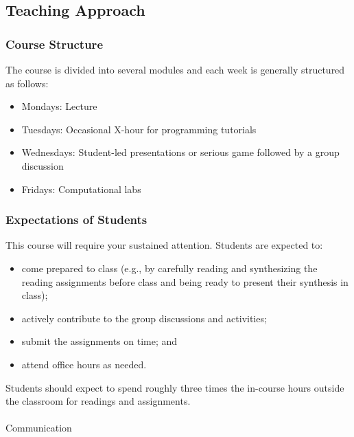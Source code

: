 \documentclass[
  11pt,
]{article}
\makeatletter
\let\oldparagraph\paragraph
\renewcommand{\paragraph}{
    \@ifstar
      \xxxParagraphStar
      \xxxParagraphNoStar
  }
\newcommand{\xxxParagraphStar}[1]{\oldparagraph*{#1}\mbox{}}
\newcommand{\xxxParagraphNoStar}[1]{\oldparagraph{#1}\mbox{}}
\providecommand{\tightlist}{%
  \setlength{\itemsep}{0pt}\setlength{\parskip}{0pt}}\usepackage{longtable,booktabs,array}
\makeatother
\begin{document}
\subsection{Teaching Approach}\label{teaching-approach}

\subsubsection{Course Structure}\label{course-structure}

The course is divided into several modules and each week is generally
structured as follows:

\begin{itemize}
\tightlist
\item
  Mondays: Lecture
\item
  Tuesdays: Occasional X-hour for programming tutorials
\item
  Wednesdays: Student-led presentations or serious game followed by a
  group discussion
\item
  Fridays: Computational labs
\end{itemize}

\subsubsection{Expectations of Students}\label{expectations-of-students}

This course will require your sustained attention. Students are expected
to:

\begin{itemize}
\tightlist
\item
  come prepared to class (e.g., by carefully reading and synthesizing
  the reading assignments before class and being ready to present their
  synthesis in class);
\item
  actively contribute to the group discussions and activities;
\item
  submit the assignments on time; and
\item
  attend office hours as needed.
\end{itemize}

Students should expect to spend roughly three times the in-course hours
outside the classroom for readings and assignments.

\paragraph{Communication}\label{communication}
\end{document}
